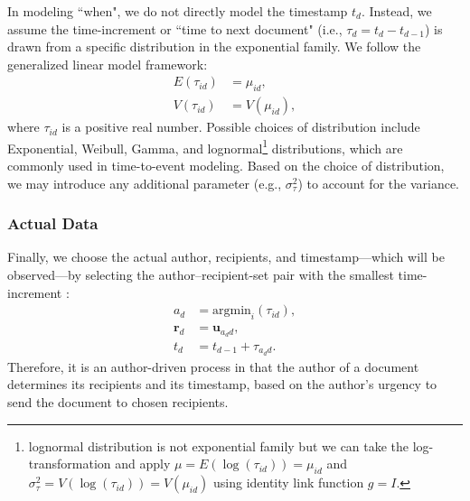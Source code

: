 \documentclass{article}
\begin{document}
In modeling ``when", we do not directly model the timestamp $t_d$. Instead, we assume the time-increment or ``time to next document" (i.e., $\tau_d = t_d-t_{d-1}$) is drawn from a specific distribution in the exponential family.  We follow the generalized linear model framework:
\begin{equation}
\begin{aligned}
E(\tau_{id}) &= \mu_{id},\\
V(\tau_{id}) &= V(\mu_{id}),
\end{aligned}
\end{equation}
where $\tau_{id}$ is a positive real number. Possible choices of distribution include Exponential, Weibull, Gamma, and lognormal\footnote{lognormal distribution is not exponential family but we can take the log-transformation and apply $\mu = E(\log(\tau_{id})) = \mu_{id}$ and $ \sigma_\tau^2=V(\log(\tau_{id})) = V(\mu_{id})$ using identity link function $g = I$.} distributions, which are commonly used in time-to-event modeling. Based on the choice of distribution, we may introduce any additional parameter (e.g., $\sigma_\tau^2$) to account for the variance.

\subsubsection{Actual Data}\label{subsubsec:Actual Data}
Finally, we choose the actual author, recipients, and timestamp---which will be observed---by selecting the author--recipient-set pair with the smallest time-increment \cite{snijders1996stochastic,snijders2017stochastic}:
\begin{equation}
\begin{aligned}
a_d &= \mbox{argmin}_{i}(\tau_{id}),\\
\boldsymbol{r}_d &= \boldsymbol{u}_{a_d d},\\
t_d &=t_{d-1} + \tau_{a_d d}.
\end{aligned}
\end{equation}
Therefore, it is an author-driven process in that the author of a document determines its recipients and its timestamp, based on the author's urgency to send the document to chosen recipients. 
\end{document}
